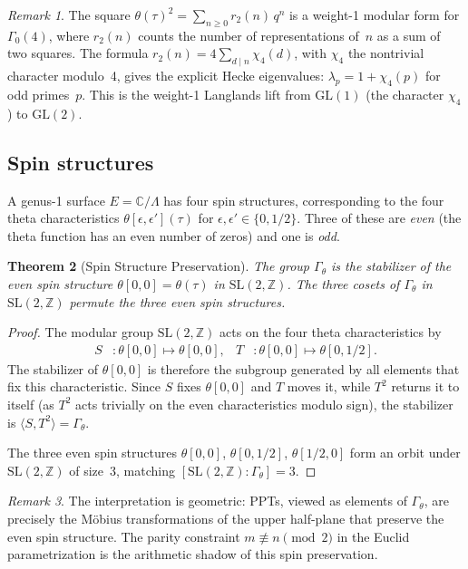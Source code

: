 \documentclass[12pt]{amsart}
\newtheorem{theorem}{Theorem}[section]
\theoremstyle{definition}
\theoremstyle{remark}
\newtheorem{remark}[theorem]{Remark}
\newcommand{\SL}{\mathrm{SL}}
\newcommand{\GL}{\mathrm{GL}}
\newcommand{\Z}{\mathbb{Z}}
\newcommand{\C}{\mathbb{C}}
\newcommand{\Gtheta}{\Gamma_\theta}
\begin{document}
\begin{remark}
The square $\theta(\tau)^2 = \sum_{n\ge 0} r_2(n)\,q^n$ is a weight-1
modular form for $\Gamma_0(4)$, where $r_2(n)$ counts the number of
representations of~$n$ as a sum of two squares.  The formula
$r_2(n) = 4\sum_{d\mid n}\chi_4(d)$, with $\chi_4$ the nontrivial
character modulo~4, gives the explicit Hecke eigenvalues:
$\lambda_p = 1 + \chi_4(p)$ for odd primes~$p$.  This is the
weight-1 Langlands lift from $\GL(1)$ (the character $\chi_4$) to
$\GL(2)$.
\end{remark}

\subsection{Spin structures}

A genus-1 surface $E = \C/\Lambda$ has four spin structures,
corresponding to the four theta characteristics
$\theta[\epsilon, \epsilon'](\tau)$ for
$\epsilon, \epsilon' \in \{0, 1/2\}$.  Three of these are \emph{even}
(the theta function has an even number of zeros) and one is \emph{odd}.

\begin{theorem}[Spin Structure Preservation]\label{thm:spin}
The group $\Gtheta$ is the stabilizer of the even spin structure
$\theta[0,0] = \theta(\tau)$ in $\SL(2,\Z)$.  The three cosets of
$\Gtheta$ in $\SL(2,\Z)$ permute the three even spin structures.
\end{theorem}

\begin{proof}
The modular group $\SL(2,\Z)$ acts on the four theta characteristics by
\begin{align*}
S &\colon \theta[0,0] \mapsto \theta[0,0], &
T &\colon \theta[0,0] \mapsto \theta[0,1/2].
\end{align*}
The stabilizer of $\theta[0,0]$ is therefore the subgroup generated
by all elements that fix this characteristic.  Since $S$ fixes
$\theta[0,0]$ and $T$ moves it, while $T^2$ returns it to itself
(as $T^2$ acts trivially on the even characteristics modulo sign),
the stabilizer is $\langle S, T^2\rangle = \Gtheta$.

The three even spin structures $\theta[0,0]$, $\theta[0,1/2]$,
$\theta[1/2,0]$ form an orbit under $\SL(2,\Z)$ of size~3, matching
$[\SL(2,\Z):\Gtheta] = 3$.
\end{proof}

\begin{remark}
The interpretation is geometric: PPTs, viewed as elements of $\Gtheta$,
are precisely the M\"obius transformations of the upper half-plane that
preserve the even spin structure.  The parity constraint
$m \not\equiv n \pmod{2}$ in the Euclid parametrization is the
arithmetic shadow of this spin preservation.
\end{remark}
\end{document}
